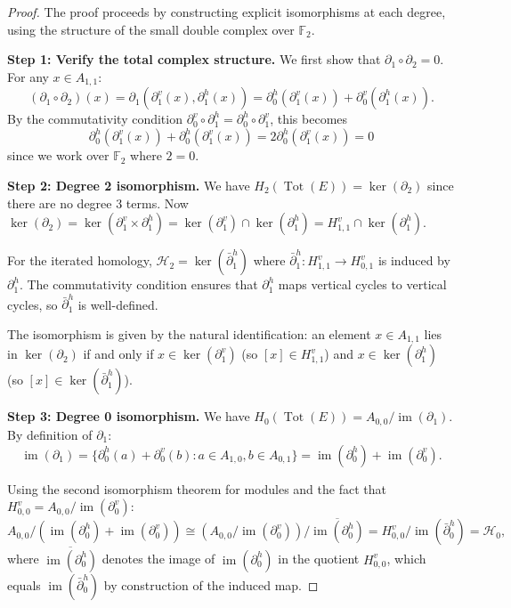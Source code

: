 \documentclass[11pt]{article}
\theoremstyle{plain}
\theoremstyle{definition}
\theoremstyle{remark}
\renewcommand{\ker}{\operatorname{ker}}
\begin{document}
\begin{proof}
The proof proceeds by constructing explicit isomorphisms at each degree, using the structure of the small double complex over $\mathbb{F}_2$.

\textbf{Step 1: Verify the total complex structure.} We first show that $\partial_1 \circ \partial_2 = 0$. For any $x \in A_{1,1}$:
\[
(\partial_1 \circ \partial_2)(x) = \partial_1(\partial^v_1(x), \partial^h_1(x)) = \partial^h_0(\partial^v_1(x)) + \partial^v_0(\partial^h_1(x)).
\]
By the commutativity condition $\partial^v_0 \circ \partial^h_1 = \partial^h_0 \circ \partial^v_1$, this becomes
\[
\partial^h_0(\partial^v_1(x)) + \partial^h_0(\partial^v_1(x)) = 2\partial^h_0(\partial^v_1(x)) = 0
\]
since we work over $\mathbb{F}_2$ where $2 = 0$.

\textbf{Step 2: Degree 2 isomorphism.} We have $H_2(\operatorname{Tot}(E)) = \ker(\partial_2)$ since there are no degree 3 terms. Now $\ker(\partial_2) = \ker(\partial^v_1 \times \partial^h_1) = \ker(\partial^v_1) \cap \ker(\partial^h_1) = H^v_{1,1} \cap \ker(\partial^h_1)$.

For the iterated homology, $\mathcal{H}_2 = \ker(\bar{\partial}^h_1)$ where $\bar{\partial}^h_1 : H^v_{1,1} \to H^v_{0,1}$ is induced by $\partial^h_1$. The commutativity condition ensures that $\partial^h_1$ maps vertical cycles to vertical cycles, so $\bar{\partial}^h_1$ is well-defined.

The isomorphism is given by the natural identification: an element $x \in A_{1,1}$ lies in $\ker(\partial_2)$ if and only if $x \in \ker(\partial^v_1)$ (so $[x] \in H^v_{1,1}$) and $x \in \ker(\partial^h_1)$ (so $[x] \in \ker(\bar{\partial}^h_1)$).

\textbf{Step 3: Degree 0 isomorphism.} We have $H_0(\operatorname{Tot}(E)) = A_{0,0}/\operatorname{im}(\partial_1)$. By definition of $\partial_1$:
\[
\operatorname{im}(\partial_1) = \{\partial^h_0(a) + \partial^v_0(b) : a \in A_{1,0}, b \in A_{0,1}\} = \operatorname{im}(\partial^h_0) + \operatorname{im}(\partial^v_0).
\]

Using the second isomorphism theorem for modules and the fact that $H^v_{0,0} = A_{0,0}/\operatorname{im}(\partial^v_0)$:
\[
A_{0,0}/(\operatorname{im}(\partial^h_0) + \operatorname{im}(\partial^v_0)) \cong (A_{0,0}/\operatorname{im}(\partial^v_0))/\overline{\operatorname{im}(\partial^h_0)} = H^v_{0,0}/\operatorname{im}(\bar{\partial}^h_0) = \mathcal{H}_0,
\]
where $\overline{\operatorname{im}(\partial^h_0)}$ denotes the image of $\operatorname{im}(\partial^h_0)$ in the quotient $H^v_{0,0}$, which equals $\operatorname{im}(\bar{\partial}^h_0)$ by construction of the induced map.


\end{proof}
\end{document}
